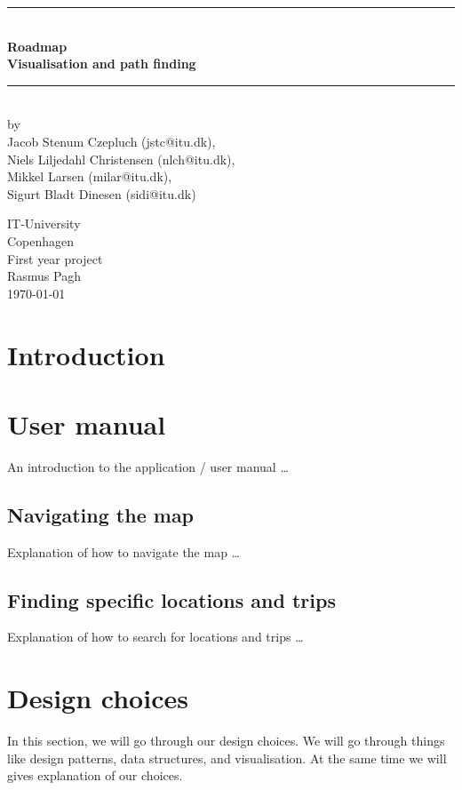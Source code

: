 \documentclass[a4paper,11pt]{article}
\begin{document}
\begin{titlepage}
\centering \parindent=0pt
\newcommand{\HRule}{\rule{\textwidth}{1mm}}
 \HRule\\[1cm]\Huge\bfseries
Roadmap\\[0.7cm]
\large Visualisation and path finding\\[1cm]
\HRule\\[4cm]  \large by \\Jacob Stenum Czepluch (jstc@itu.dk), \\Niels Liljedahl Christensen (nlch@itu.dk), \\Mikkel Larsen (milar@itu.dk), \\Sigurt Bladt Dinesen (sidi@itu.dk) \\
 \normalsize %
\begin{flushleft}
IT-University\\
Copenhagen\\
First year project\\
Rasmus Pagh\\
\today \end{flushleft}
\end{titlepage}

\tableofcontents
\pagebreak

\pagebreak
\section{Introduction}


\pagebreak
\section{User manual}
An introduction to the application / user manual \ldots

\subsection{Navigating the map}
Explanation of how to navigate the map \ldots

\subsection{Finding specific locations and trips}
Explanation of how to search for locations and trips \ldots

\pagebreak
\section{Design choices}
\label{sec:Design choices}
In this section, we will go through our design choices. We will go through things like design patterns, data structures, and visualisation. At the same time we will gives explanation of our choices.
\end{document}
